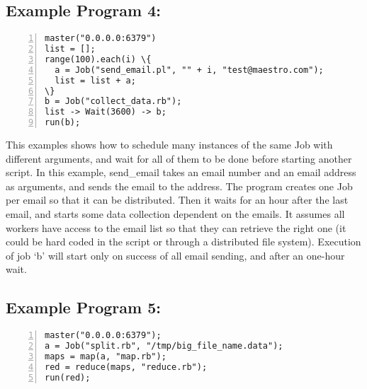 \subsection*{Example Program 4:}
\begin{Verbatim}[numbers=left,commandchars=\\\{\}]
master("0.0.0.0:6379")
list = [];
range(100).each(i) \{
  a = Job("send_email.pl", "" + i, "test@maestro.com");
  list = list + a;
\}
b = Job("collect_data.rb");
list -> Wait(3600) -> b;
run(b);
\end{Verbatim}

This examples shows how to schedule many instances of the same Job with different
arguments, and wait for all of them to be done before starting another script.
In this example, send\_email takes an email number and an email address as arguments,
and sends the email to the address. The program creates one Job per email so that it
can be distributed. Then it waits for an hour after the last email, and starts some data
collection dependent on the emails. It assumes all workers have access to the email list
so that they can retrieve the right one (it could be hard coded in the script or through a distributed
file system).
Execution of job `b' will start only on success of all email sending,
and after an one-hour wait.

\subsection*{Example Program 5:}
\begin{Verbatim}[numbers=left,commandchars=\\\{\}]
master("0.0.0.0:6379");
a = Job("split.rb", "/tmp/big_file_name.data");
maps = map(a, "map.rb");
red = reduce(maps, "reduce.rb");
run(red);
\end{Verbatim}

